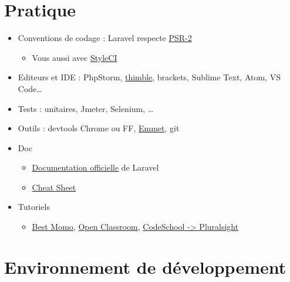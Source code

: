\hypertarget{pratique}{%
\section{Pratique}\label{pratique}}

\begin{itemize}
\tightlist
\item
  Conventions de codage : Laravel respecte
  \href{https://laravel.com/docs/5.1/contributions\#coding-style}{PSR-2}

  \begin{itemize}
  \tightlist
  \item
    Vous aussi avec \href{https://styleci.io/}{StyleCI}
  \end{itemize}
\item
  Editeurs et IDE : PhpStorm,
  \href{https://thimble.mozilla.org/fr/}{thimble}, brackets, Sublime
  Text, Atom, VS Code\ldots{}
\item
  Tests : unitaires, Jmeter, Selenium, \ldots{}
\item
  Outils : devtools Chrome ou FF, \href{http://emmet.io/}{Emmet}, git
\item
  Doc

  \begin{itemize}
  \tightlist
  \item
    \href{https://laravel.com/docs/master}{Documentation officielle} de
    Laravel
  \item
    \href{https://summerblue.github.io/laravel5-cheatsheet/\#}{Cheat
    Sheet}
  \end{itemize}
\item
  Tutoriels

  \begin{itemize}
  \tightlist
  \item
    \href{http://laravel.sillo.org/laravel-5/}{Best Momo},
    \href{https://openclassrooms.com/courses/decouvrez-le-framework-php-laravel-1}{Open
    Classroom},
    \href{https://www.codeschool.com/courses/try-laravel}{CodeSchool
    -\textgreater{} Pluralsight}
  \end{itemize}
\end{itemize}

\hypertarget{environnement-de-duxe9veloppement}{%
\section{Environnement de
développement}\label{environnement-de-duxe9veloppement}}

